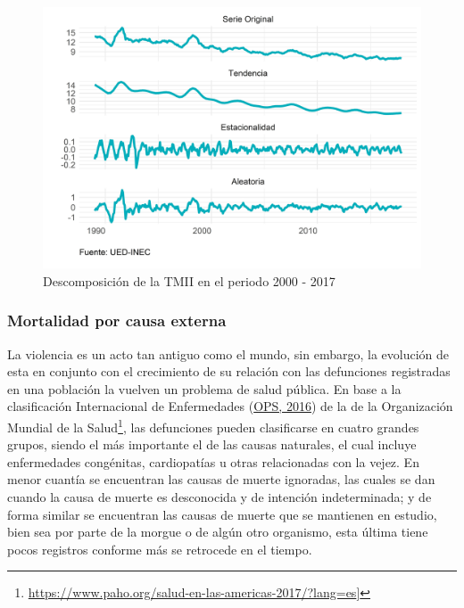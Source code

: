 \documentclass[
]{article}
\begin{document}
\begin{figure}[H]
\includegraphics[width=1\linewidth,height=1\textheight]{Tesis_files/figure-latex/tmiiplotdescomposicion-1} \caption{Descomposición de la TMII en el periodo 2000 - 2017}\label{fig:tmiiplotdescomposicion}
\end{figure}

\subsubsection{Mortalidad por causa externa}

La violencia es un acto tan antiguo como el mundo, sin embargo, la
evolución de esta en conjunto con el crecimiento de su relación con las
defunciones registradas en una población la vuelven un problema de salud
pública. En base a la clasificación Internacional de Enfermedades
(\protect\hyperlink{ref-CIE10}{OPS, 2016}) de la de la Organización
Mundial de la Salud\footnote{\url{https://www.paho.org/salud-en-las-americas-2017/?lang=es}{]}},
las defunciones pueden clasificarse en cuatro grandes grupos, siendo el
más importante el de las causas naturales, el cual incluye enfermedades
congénitas, cardiopatías u otras relacionadas con la vejez. En menor
cuantía se encuentran las causas de muerte ignoradas, las cuales se dan
cuando la causa de muerte es desconocida y de intención indeterminada; y
de forma similar se encuentran las causas de muerte que se mantienen en
estudio, bien sea por parte de la morgue o de algún otro organismo, esta
última tiene pocos registros conforme más se retrocede en el tiempo.
\end{document}
